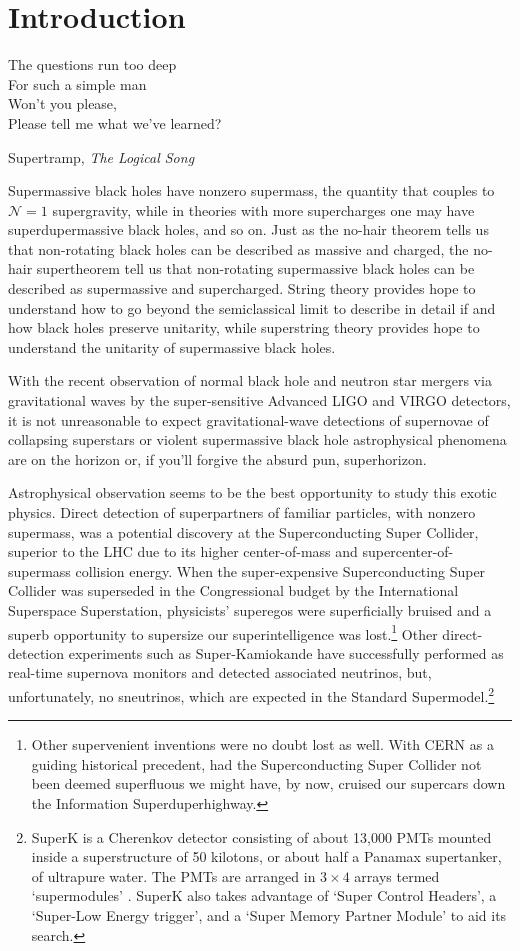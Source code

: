 \section{Introduction}

\epigraph{The questions run too deep\\
For such a simple man\\
Won't you please, \\
Please tell me what we've learned?}{Supertramp, \textit{The Logical Song}}

Supermassive black holes have nonzero supermass, the quantity that couples to $\mathcal{N}=1$ supergravity, while in theories with more supercharges one may have superdupermassive black holes, and so on.
Just as the no-hair theorem tells us that non-rotating black holes can be described as massive and charged, the no-hair supertheorem tell us that non-rotating supermassive black holes can be described as supermassive and supercharged.
String theory provides hope to understand how to go beyond the semiclassical limit to describe in detail if and how black holes preserve unitarity, while superstring theory provides hope to understand the unitarity of supermassive black holes.

With the recent observation of normal black hole \cite{Abbott:2016blz,Abbott:2016nmj,Abbott:2017vtc,Abbott:2017oio,Abbott:2017gyy} and neutron star\cite{TheLIGOScientific:2017qsa} mergers via gravitational waves by the super-sensitive Advanced LIGO and VIRGO detectors, it is not unreasonable to expect gravitational-wave detections of supernovae of collapsing superstars or violent supermassive black hole astrophysical phenomena are on the horizon or, if you'll forgive the absurd pun, superhorizon.

Astrophysical observation seems to be the best opportunity to study this exotic physics.
Direct detection of superpartners of familiar particles, with nonzero supermass, was a potential discovery at the Superconducting Super Collider, superior to the LHC due to its higher center-of-mass and supercenter-of-supermass collision energy.
When the super-expensive Superconducting Super Collider was superseded in the Congressional budget by the International Superspace Superstation, physicists' superegos were superficially bruised and a superb opportunity to supersize our superintelligence was lost.\footnote{
Other supervenient inventions were no doubt lost as well.
With CERN as a guiding historical precedent, had the Superconducting Super Collider not been deemed superfluous we might have, by now, cruised our supercars down the Information Superduperhighway.}
Other direct-detection experiments such as Super-Kamiokande have successfully performed as real-time supernova monitors and detected associated neutrinos, but, unfortunately, no sneutrinos, which are expected in the Standard Supermodel.\footnote{ 
SuperK is a Cherenkov detector consisting of about 13,000 PMTs mounted inside a superstructure of 50 kilotons, or about half a Panamax supertanker, of ultrapure water.  The PMTs are arranged in $3\times4$ arrays termed `supermodules' \cite{Fukuda:2002uc}.
SuperK also takes advantage of `Super Control Headers', a `Super-Low Energy trigger', and a `Super Memory Partner Module' to aid its search.
}

